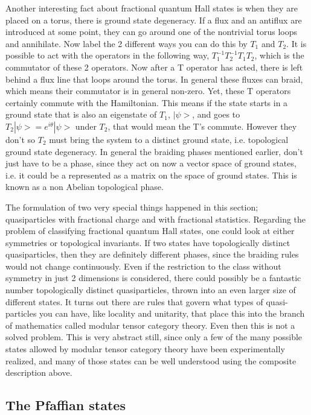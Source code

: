 Another interesting fact about fractional quantum Hall states is when they are placed on a torus, there is ground state degeneracy. If a flux and an antiflux are introduced at some point, they can go around one of the nontrivial torus loops and annihilate. Now label the 2 different ways you can do this by $T_1$ and $T_2$. It is possible to act with the operators in the following way, $T_1^{-1}T_2^{-1}T_1T_2$, which is the commutator of these 2 operators. Now after a T operator has acted, there is left behind a flux line that loops around the torus. In general these fluxes can braid, which means their commutator is in general non-zero. Yet, these T operators certainly commute with the Hamiltonian. This means if the state starts in a ground state that is also an eigenstate of $T_1$, $|\psi>$, and goes to $T_2|\psi>=e^{i\theta}|\psi>$ under $T_2$, that would mean the T's commute. However they don't so $T_2$ must bring the system to a distinct ground state, i.e. topological ground state degeneracy. In general the braiding phases mentioned earlier, don't just have to be a phase, since they act on now a vector space of ground states, i.e. it could be a represented as a matrix on the space of ground states. This is known as a non Abelian topological phase.

The formulation of two very special things happened in this section; quasiparticles with fractional charge and with fractional statistics. Regarding the problem of classifying fractional quantum Hall states, one could look at either symmetries or topological invariants. If two states have topologically distinct quasiparticles, then they are definitely different phases, since the braiding rules would not change continuously. Even if the restriction to the class without symmetry in just 2 dimensions is considered, there could possibly be a fantastic number topologically distinct quasiparticles, thrown into an even larger size of different states. It turns out there are rules that govern what types of quasi-particles you can have, like locality and unitarity, that place this into the branch of mathematics called modular tensor category theory. Even then this is not a solved problem. This is very abstract still, since only a few of the many possible states allowed by modular tensor category theory have been experimentally realized, and many of those states can be well understood using the composite description above.

\subsection{The Pfaffian states}

